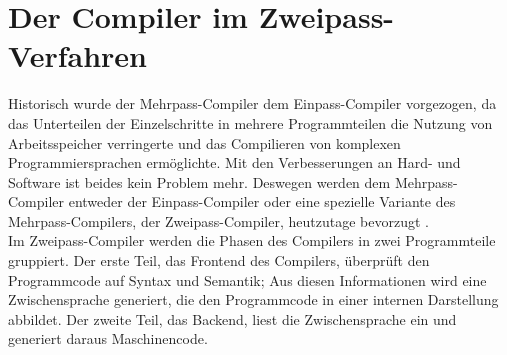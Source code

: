\chapter{Der Compiler im Zweipass-Verfahren}
\label{chap:theory:zweipassCompiler}

Historisch wurde der Mehrpass-Compiler dem Einpass-Compiler vorgezogen, da das Unterteilen der Einzelschritte in mehrere Programmteilen die Nutzung von Arbeitsspeicher verringerte und das Compilieren von komplexen Programmiersprachen ermöglichte.
Mit den Verbesserungen an Hard- und Software ist beides kein Problem mehr.
Deswegen werden dem Mehrpass-Compiler entweder der Einpass-Compiler oder eine spezielle Variante des Mehrpass-Compilers, der Zweipass-Compiler, heutzutage bevorzugt \cite{mossenbock:2024}.\\
Im Zweipass-Compiler werden die Phasen des Compilers in zwei Programmteile gruppiert.
Der erste Teil, das Frontend des Compilers, überprüft den Programmcode auf Syntax und Semantik;
Aus diesen Informationen wird eine Zwischensprache generiert, die den Programmcode in einer internen Darstellung abbildet.
Der zweite Teil, das Backend, liest die Zwischensprache ein und generiert daraus Maschinencode.\\

